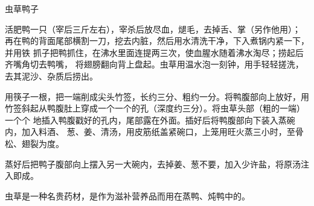 %
%
%
%
%
%
%
\begin{recipe}{虫草鸭子}

\ingredients


\preparation

\step 活肥鸭一只（宰后三斤左右），宰杀后放尽血，煺毛，去掉舌、掌（另作他用）；
再在鸭的背面尾部横割一刀，挖去内脏，然后用水清洗干净，下入煮锅内紧一下，并用铁
抓子把鸭抓住，在沸水里面连提两三次，使血腥水随着沸水淘尽；捞起后齐嘴角切去鸭嘴，
将翅膀翻向背上盘起。虫草用温水泡一刻钟，用手轻轻搓洗，去其泥沙、杂质后捞出。

\step 用筷子一根，把一端削成尖头竹签，长约三分、粗约一分。将鸭腹部向上放好，用
竹签斜起从鸭腹肚上穿成一个一个的孔（深度约三分）。将虫草头部（粗的一端）一个个
地插入鸭腹戳好的孔内，尾部露在外面。插好后将鸭腹部向下装入蒸碗内，加入料酒、
葱、姜、清汤，用皮筋纸盖紧碗口，上笼用旺火蒸三小时，至骨松、翅裂为度。

\step 蒸好后把鸭子腹部向上摆入另一大碗内，去掉姜、葱不要，加入少许盐，将原汤注
入即成。

\features

虫草是一种名贵药材，是作为滋补营养品而用在蒸鸭、炖鸭中的。

\end{recipe}

